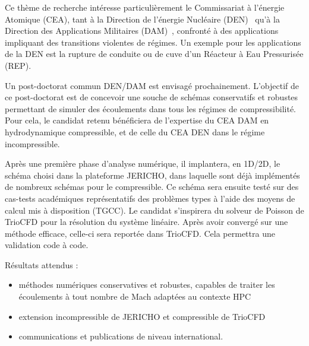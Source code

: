 Ce th\`eme de recherche int\'eresse particuli\`erement le Commissariat \`a l'\'energie Atomique (CEA), tant \`a la Direction de l'\'energie Nucl\'eaire (DEN)~\cite{chalons2016all,cordier2012asymptotic,dellacherie2016construction} qu'\`a la Direction des Applications Militaires (DAM)~\cite{labourasse2019low,moguen2015godunov}, confront\'e \`a des applications impliquant des transitions violentes de r\'egimes. Un exemple pour les applications de la DEN est la rupture de conduite ou de cuve d'un R\'eacteur \`a Eau Pressuris\'ee (REP). 

Un post-doctorat commun DEN/DAM est envisag\'e prochainement. L'objectif de ce post-doctorat est de concevoir une souche de sch\'emas conservatifs et robustes permettant de simuler des \'ecoulements dans tous les r\'egimes de compressibilit\'e. Pour cela, le candidat retenu b\'en\'eficiera de l'expertise du CEA DAM en hydrodynamique compressible, et de celle du CEA DEN dans le r\'egime incompressible. 

Apr\`es une premi\`ere phase d'analyse num\'erique, il implantera, en 1D/2D, le sch\'ema choisi dans la plateforme JERICHO, dans laquelle sont d\'ej\`a impl\'ement\'es de nombreux sch\'emas pour le compressible. Ce sch\'ema sera ensuite test\'e sur des cas-tests acad\'emiques repr\'esentatifs des probl\`emes types \`a l'aide des moyens de calcul mis \`a disposition (TGCC). Le candidat s'inspirera du solveur de Poisson de TrioCFD pour la r\'esolution du syst\`eme lin\'eaire. Apr\`es avoir converg\'e sur une m\'ethode efficace, celle-ci sera report\'ee dans TrioCFD. Cela permettra une validation code \`a code.

R\'esultats attendus : 
\begin{itemize}
\item m\'ethodes num\'eriques conservatives et robustes, capables de traiter les \'ecoulements \`a tout nombre de Mach adapt\'ees au contexte HPC
\item extension incompressible de JERICHO et compressible de TrioCFD
\item communications et publications de niveau international.
\end{itemize}

